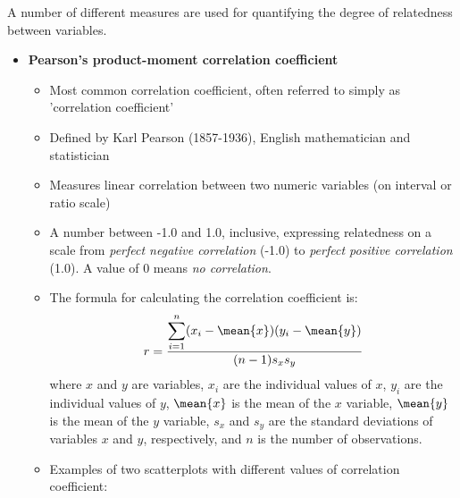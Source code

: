 \newpage

A number of different measures are used for quantifying the degree of relatedness between variables. 
\begin{itemize}
  
\item \textbf{Pearson's product-moment correlation coefficient}
  \begin{itemize}
  \item Most common correlation coefficient, often referred to simply as 'correlation coefficient'
  \item Defined by Karl Pearson (1857-1936), English mathematician and statistician 
  \item Measures linear correlation between two numeric variables (on interval or ratio scale)
  \item A number between -1.0 and 1.0, inclusive, expressing relatedness on a scale from \emph{perfect negative correlation} (-1.0) to \emph{perfect positive correlation} (1.0). A value of 0 means \emph{no correlation}.
    \newpage
    
  \item The formula for calculating the correlation coefficient is:
    $$ r = \dfrac{\displaystyle\sum_{i=1}^n (x_i - \mean{x})(y_i - \mean{y})}{(n-1)s_xs_y} $$    
    where $x$ and $y$ are variables, $x_i$ are the individual values of $x$, $y_i$ are the individual values of $y$, $\mean{x}$ is the mean of the $x$ variable, $\mean{y}$ is the mean of the $y$ variable, $s_x$ and $s_y$ are the standard deviations of variables $x$ and $y$, respectively, and $n$ is the number of observations.  
  \item Examples of two scatterplots with different values of correlation coefficient:
    

\end{itemize}
\end{itemize}
